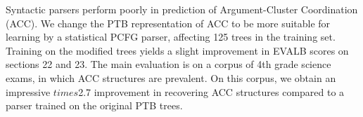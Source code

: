 Syntactic parsers perform poorly in prediction of Argument-Cluster Coordination (ACC). We change the PTB representation of ACC to be more suitable for learning by a statistical PCFG parser, affecting 125 trees in the training set. Training on the modified trees yields a slight improvement in EVALB scores on sections 22 and 23. The main evaluation is on a corpus of 4th grade science exams, in which ACC structures are prevalent.  On this corpus, we obtain an impressive $times$2.7 improvement in recovering ACC structures compared to a parser trained on the original PTB trees.
